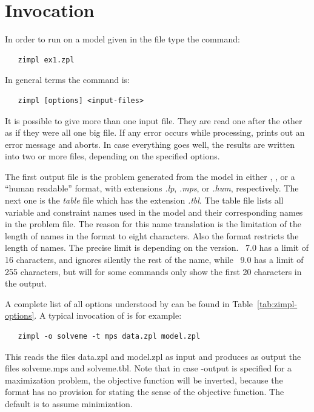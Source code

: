 \section{Invocation}

In order to run \zimpl on a model given in the file  type the command:
\begin{verbatim}
   zimpl ex1.zpl
\end{verbatim}
In general terms the command is:
\begin{verbatim}
   zimpl [options] <input-files>
\end{verbatim}
It is possible to give more than one input file. They are read one
after the other as if they were all one big file.
If any error occurs while processing, \zimpl prints out an
error message and aborts. In case everything goes well, the results
are written into two or more files, depending on the specified options.

The first output file is the problem generated from the model in either
\cplex \lp, \mps, or  a ``human readable'' format,
with extensions \emph{.lp}, \emph{.mps}, or \emph{.hum}, respectively.
The next one is the \emph{table} file which has the extension \emph{.tbl}.
The table file lists all variable and constraint names used in the model
and their corresponding names in the problem file.
The reason for this name translation is the limitation of the length
of names in the \mps format to
eight characters. Also the \lp format
restricts the length of names. The precise limit is depending on the
version. \cplex~7.0 has a limit of 16 characters, and ignores
silently the rest of the name, while \cplex~9.0 has a limit of 255
characters, but will for some commands only show the first 20 characters
in the output.


A complete list of all options understood by \zimpl can be found in
Table~\ref{tab:zimpl-options}.
A typical invocation of \zimpl is for example:
\begin{verbatim}
   zimpl -o solveme -t mps data.zpl model.zpl
\end{verbatim}
This reads the files data.zpl and model.zpl as
input and produces as output the files solveme.mps and solveme.tbl.
Note that in case \mps-output is specified for a maximization problem,
the objective function will be inverted, because the \mps format has no
provision for stating the sense of the objective function. The default
is to assume minimization.

